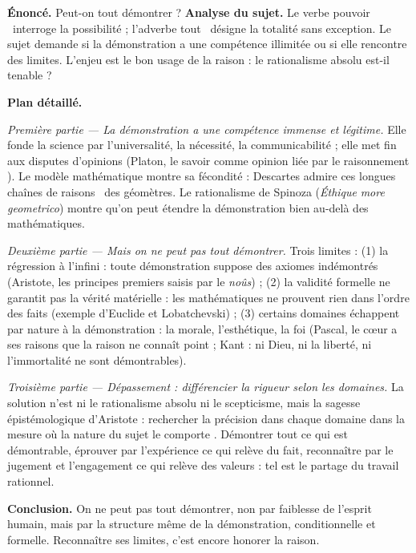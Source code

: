 \documentclass[11pt]{article}
\begin{document}
\begin{exoresolu}
\textbf{Énoncé.} Peut-on tout démontrer ?
\tcblower
\textbf{Analyse du sujet.} Le verbe \guillemotleft pouvoir \guillemotright\ interroge la possibilité ; l'adverbe \guillemotleft tout \guillemotright\ désigne la totalité sans exception. Le sujet demande si la démonstration a une compétence illimitée ou si elle rencontre des limites. L'enjeu est le bon usage de la raison : le rationalisme absolu est-il tenable ?

\textbf{Plan détaillé.}

\emph{Première partie — La démonstration a une compétence immense et légitime.} Elle fonde la science par l'universalité, la nécessité, la communicabilité ; elle met fin aux disputes d'opinions (Platon, le savoir comme opinion \guillemotleft liée par le raisonnement \guillemotright). Le modèle mathématique montre sa fécondité : Descartes admire \guillemotleft ces longues chaînes de raisons \guillemotright\ des géomètres. Le rationalisme de Spinoza (\emph{Éthique} \emph{more geometrico}) montre qu'on peut étendre la démonstration bien au-delà des mathématiques.

\emph{Deuxième partie — Mais on ne peut pas tout démontrer.} Trois limites : (1) la régression à l'infini : toute démonstration suppose des axiomes indémontrés (Aristote, les principes premiers saisis par le \emph{noûs}) ; (2) la validité formelle ne garantit pas la vérité matérielle : les mathématiques ne prouvent rien dans l'ordre des faits (exemple d'Euclide et Lobatchevski) ; (3) certains domaines échappent par nature à la démonstration : la morale, l'esthétique, la foi (Pascal, \guillemotleft le cœur a ses raisons que la raison ne connaît point \guillemotright ; Kant : ni Dieu, ni la liberté, ni l'immortalité ne sont démontrables).

\emph{Troisième partie — Dépassement : différencier la rigueur selon les domaines.} La solution n'est ni le rationalisme absolu ni le scepticisme, mais la sagesse épistémologique d'Aristote : \guillemotleft rechercher la précision dans chaque domaine dans la mesure où la nature du sujet le comporte \guillemotright. Démontrer tout ce qui est démontrable, éprouver par l'expérience ce qui relève du fait, reconnaître par le jugement et l'engagement ce qui relève des valeurs : tel est le partage du travail rationnel.

\textbf{Conclusion.} On ne peut pas tout démontrer, non par faiblesse de l'esprit humain, mais par la structure même de la démonstration, conditionnelle et formelle. Reconnaître ses limites, c'est encore honorer la raison.
\end{exoresolu}
\end{document}
